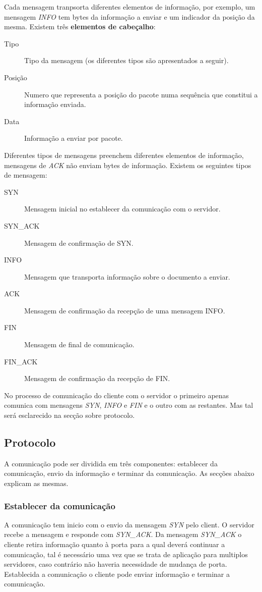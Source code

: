 \documentclass{article}
\begin{document}
Cada mensagem tranpsorta diferentes elementos de informação, por exemplo, um mensagem \textit{INFO} tem bytes da informação a enviar e um indicador da posição da mesma. Existem três \textbf{elementos de cabeçalho}:


\begin{description}
	\item[Tipo] 	Tipo da mensagem (os diferentes tipos são apresentados a seguir).
	\item[Posição] 	Numero que representa a posição do pacote numa sequência que constitui a informação enviada.
	\item[Data] 	Informação a enviar por pacote.
\end{description}


Diferentes tipos de mensagens preenchem diferentes elementos de informação, mensagens de \textit{ACK} não enviam bytes de informação. Existem os seguintes tipos de mensagem:


\begin{description}
	\item[SYN] Mensagem inicial no establecer da comunicação com o servidor.
	\item[SYN\_ACK] Mensagem de confirmação de SYN.
	\item[INFO] Mensagem que transporta informação sobre o documento a enviar.
	\item[ACK] Mensagem de confirmação da recepção de uma mensagem INFO.
	\item[FIN] Mensagem de final de comunicação.
	\item[FIN\_ACK] Mensagem de confirmação da recepção de FIN.
\end{description}


No processo de comunicação do cliente com o servidor o primeiro apenas comunica com mensagens \textit{SYN}, \textit{INFO} e \textit{FIN} e o outro com as restantes. Mas tal será esclarecido na secção sobre protocolo.


\subsection{Protocolo}
A comunicação pode ser dividida em três componentes: establecer da comunicação, envio da informação e terminar da comunicação. As secções abaixo explicam as mesmas.

\subsubsection{Establecer da comunicação}
A comunicação tem inicio com o envio da mensagem \textit{SYN} pelo client. O servidor recebe a mensagem e responde com \textit{SYN\_ACK}. Da mensagem \textit{SYN\_ACK} o cliente retira informação quanto à porta para a qual deverá continuar a comunicação, tal é necessário uma vez que se trata de aplicação para multiplos servidores, caso contrário não haveria necessidade de mudança de porta. Establecida a comunicação o cliente pode enviar informação e terminar a comunicação.
\end{document}
